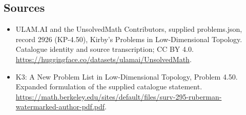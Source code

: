 \documentclass[11pt,a4paper]{article}
\begin{document}
\subsection{Sources}
\begin{itemize}
\item[S1] ULAM.AI and the UnsolvedMath Contributors, supplied problems.json, record 2926 (KP-4.50), Kirby's Problems in Low-Dimensional Topology. Catalogue identity and source transcription; CC BY 4.0.
\url{https://huggingface.co/datasets/ulamai/UnsolvedMath}.
\item[S2] K3: A New Problem List in Low-Dimensional Topology, Problem 4.50. Expanded formulation of the supplied catalogue statement.
\url{https://math.berkeley.edu/sites/default/files/surv-295-ruberman-watermarked-author-pdf.pdf}.
\end{itemize}
\end{document}

